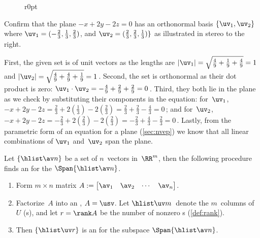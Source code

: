 \begin{figure}r{0pt}
 {}
\end{figure}
\begin{example} \label{eg:orthbas2}
Confirm that the plane \(-x+2y-2z=0\) has an orthonormal basis \(\{\uv_1,\uv_2\}\) where \(\uv_1=(-\frac23,\frac13,\frac23)\), and \(\uv_2=(\frac23,\frac23,\frac13)\}\) as illustrated in stereo to the right.

\begin{solution} 
First, the given set is of unit vectors as the lengths are \(|\uv_1|=\sqrt{\frac49+\frac19+\frac49}=1\) and \(|\uv_2|=\sqrt{\frac49+\frac49+\frac19}=1\)\,.
Second, the set is orthonormal as their dot product is zero: \(\uv_1\cdot\uv_2=-\frac49+\frac29+\frac29=0\)\,.
Third, they both lie in the plane as we check by substituting their components in the equation: for~\(\uv_1\), \(-x+2y-2z=\frac23+2(\frac13)-2(\frac23)=\frac23+\frac23-\frac43=0\)\,; and for~\(\uv_2\), \(-x+2y-2z=-\frac23+2(\frac23)-2(\frac23)=-\frac23+\frac43-\frac23=0\)\,.
Lastly, from the parametric form of an equation for a plane (\cref{sec:nvep}) we know that all linear combinations of \(\uv_1\) and~\(\uv_2\) span the plane.
\aqed

\end{solution}
\end{example}





\begin{procedure}\label{pro:ospan}
	Let $\{\hlist\av n\}$ be a set of $n$~vectors in~\(\RR^m\), then the following procedure finds an  for the  \(\Span\{\hlist\av n\}\). 
\begin{enumerate}
\item Form \(m\times n\) matrix $A:= \begin{bmatrix} \av_1 & \av_2& \cdots&\av_n \end{bmatrix}$. 
\item Factorize~\(A\) into an \svd, $A=\usv$. 
Let \(\hlist\uv m\)~denote the \(m\)~columns of~$U$ (s), and let \(r=\rank A\) be the number of nonzero s (\cref{def:rank}).  
\item Then \(\{\hlist\uv r\}\) is an  for the subspace \(\Span\{\hlist\av n\}\).
\end{enumerate}
\end{procedure}

